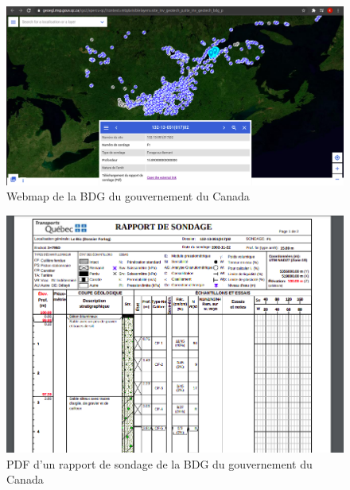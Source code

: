 \begin{figure}[t]
    \centering
    \includegraphics[width=1\textwidth]{images/Contexte/bdg.png}
    \caption{Webmap de la BDG du gouvernement du Canada \cite{canadagov}}
    \label{fig:BDG}
\end{figure}
\begin{figure}[t]
    \centering
    \includegraphics[width=1\textwidth]{images/Contexte/pdf_bdg.png}
    \caption{PDF d'un rapport de sondage de la BDG du gouvernement du Canada \cite{linkpdfcanada}}
    \label{fig:PDF_BDG}
\end{figure}
